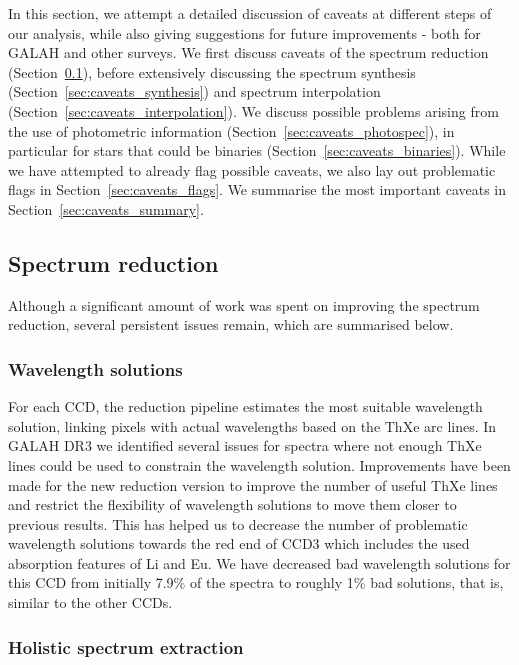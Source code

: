 \documentclass[
  journal=pasa,
  manuscript=research-paper, %
  year=2024,
  volume=37
]{cup-journal}
\begin{document}
In this section, we attempt a detailed discussion of caveats at different steps of our analysis, while also giving suggestions for future improvements - both for GALAH and other surveys. We first discuss caveats of the spectrum reduction (Section~\ref{sec:caveats_reduction}), before extensively discussing the spectrum synthesis (Section~\ref{sec:caveats_synthesis}) and spectrum interpolation (Section~\ref{sec:caveats_interpolation}). We discuss possible problems arising from the use of photometric information (Section~\ref{sec:caveats_photospec}), in particular for stars that could be binaries (Section~\ref{sec:caveats_binaries}). While we have attempted to already flag possible caveats, we also lay out problematic flags in Section~\ref{sec:caveats_flags}. We summarise the most important caveats in Section~\ref{sec:caveats_summary}.

\subsection{Spectrum reduction}  \label{sec:caveats_reduction}

Although a significant amount of work was spent on improving the spectrum reduction, several persistent issues remain, which are summarised below.

\subsubsection{Wavelength solutions}

For each CCD, the reduction pipeline estimates the most suitable wavelength solution, linking pixels with actual wavelengths based on the ThXe arc lines. In GALAH DR3 \citep{Buder2021} we identified several issues for spectra where not enough ThXe lines could be used to constrain the wavelength solution. Improvements have been made for the new reduction version to improve the number of useful ThXe lines and restrict the flexibility of wavelength solutions to move them closer to previous results. This has helped us to decrease the number of problematic wavelength solutions towards the red end of CCD3 which includes the used absorption features of Li and Eu. We have decreased bad wavelength solutions for this CCD from initially 7.9\% of the spectra to roughly 1\% bad solutions, that is, similar to the other CCDs.

\subsubsection{Holistic spectrum extraction}
\end{document}
